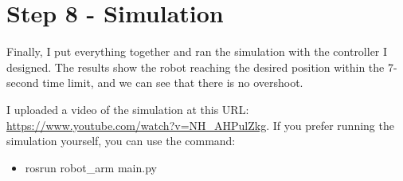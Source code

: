 \documentclass[12pt,a4paper]{article}
\begin{document}
\section{Step 8 - Simulation}
Finally, I put everything together and ran the simulation with the controller I designed.
The results show the robot reaching the desired position within the 7-second time limit,
and we can see that there is no overshoot.

I uploaded a video of the simulation at this URL: \url{https://www.youtube.com/watch?v=NH_AHPulZkg}. If
you prefer running the simulation yourself, you can use the command:
\begin{itemize}
    \item rosrun robot\_arm main.py
\end{itemize}
\end{document}

